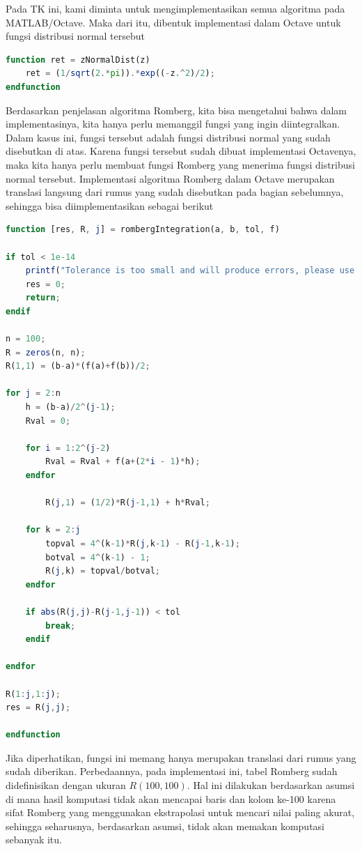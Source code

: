 \documentclass[journal,12pt,onecolumn,a4paper]{IEEEtran}
\begin{document}
Pada TK ini, kami diminta untuk mengimplementasikan semua algoritma pada MATLAB/Octave. Maka dari itu, dibentuk implementasi dalam Octave untuk fungsi distribusi normal tersebut

\begin{center}
	\begin{lstlisting}[language=Octave]
function ret = zNormalDist(z)
	ret = (1/sqrt(2.*pi)).*exp((-z.^2)/2);
endfunction
	\end{lstlisting}
\end{center}

Berdasarkan penjelasan algoritma Romberg, kita bisa mengetahui bahwa dalam implementasinya, kita hanya perlu memanggil fungsi yang ingin diintegralkan. Dalam kasus ini, fungsi tersebut adalah fungsi distribusi normal yang sudah disebutkan di atas. Karena fungsi tersebut sudah dibuat implementasi Octavenya, maka kita hanya perlu membuat fungsi Romberg yang menerima fungsi distribusi normal tersebut. Implementasi algoritma Romberg dalam Octave merupakan translasi langsung dari rumus yang sudah disebutkan pada bagian sebelumnya, sehingga bisa diimplementasikan sebagai berikut
\begin{center}
	\begin{lstlisting}[language=Octave]
function [res, R, j] = rombergIntegration(a, b, tol, f)

if tol < 1e-14
	printf("Tolerance is too small and will produce errors, please use larger values\n")
	res = 0;
	return;
endif

n = 100;
R = zeros(n, n);
R(1,1) = (b-a)*(f(a)+f(b))/2;

for j = 2:n
	h = (b-a)/2^(j-1);
	Rval = 0;

	for i = 1:2^(j-2)
		Rval = Rval + f(a+(2*i - 1)*h);
	endfor

		R(j,1) = (1/2)*R(j-1,1) + h*Rval;

	for k = 2:j
		topval = 4^(k-1)*R(j,k-1) - R(j-1,k-1);
		botval = 4^(k-1) - 1;
		R(j,k) = topval/botval;
	endfor

	if abs(R(j,j)-R(j-1,j-1)) < tol
		break;
	endif

endfor

R(1:j,1:j);
res = R(j,j);

endfunction
	\end{lstlisting}
\end{center}

Jika diperhatikan, fungsi ini memang hanya merupakan translasi dari rumus yang sudah diberikan. Perbedaannya, pada implementasi ini, tabel Romberg sudah didefinisikan dengan ukuran \(R(100,100)\). Hal ini dilakukan berdasarkan asumsi di mana hasil komputasi tidak akan mencapai baris dan kolom ke-100 karena sifat Romberg yang menggunakan ekstrapolasi untuk mencari nilai paling akurat, sehingga seharusnya, berdasarkan asumsi, tidak akan memakan komputasi sebanyak itu.
\end{document}
